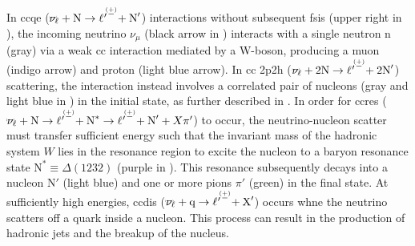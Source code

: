In \acrshort{cc}\acrshort{qe} ($\accentset{\brobor\vspace{-.5mm}}{\nu}_\ell + \text{N} \rightarrow \ell{\hspace{0.1ex}'}^{\hspace{0.1ex} \accentset{(+)\vspace{-.8mm}}{-}} + \text{N}'$) interactions without subsequent \acrshort{fsi}s (upper right in ), the incoming neutrino $\nu_\mu$ (black arrow in ) interacts with a single neutron n (gray) via a weak \acrshort{cc} interaction mediated by a W-boson, producing a muon (indigo arrow) and proton (light blue arrow).
In \acrshort{cc} \acrshort{2p2h} ($\accentset{\brobor\vspace{-.5mm}}{\nu}_\ell + 2\text{N} \rightarrow \ell{\hspace{0.1ex}'}^{\hspace{0.1ex} \accentset{(+)\vspace{-.8mm}}{-}} + 2\text{N}'$) scattering, the interaction instead involves a correlated pair of nucleons (gray and light blue in ) in the initial state, as further described in .
In order for \acrshort{cc}\acrshort{res} ($\accentset{\brobor\vspace{-.5mm}}{\nu}_\ell + \text{N} \rightarrow \ell{\hspace{0.1ex}'}^{\hspace{0.1ex} \accentset{(+)\vspace{-.8mm}}{-}} + \text{N}^* \rightarrow \ell{\hspace{0.1ex}'}^{\hspace{0.1ex} \accentset{(+)\vspace{-.8mm}}{-}} + \text{N}' + X\pi'$) to occur, the neutrino-nucleon scatter must transfer sufficient energy such that the invariant mass of the hadronic system $W$ lies in the resonance region to excite the nucleon to a baryon resonance state $\text{N}^* \equiv \Delta (1232)$ (purple in ). This resonance subsequently decays into a nucleon $\text{N}'$ (light blue) and one or more pions $\pi'$ (green) in the final state.
At sufficiently high energies, \acrshort{cc}\acrshort{dis} ($\accentset{\brobor\vspace{-.5mm}}{\nu}_\ell + \text{q} \rightarrow \ell{\hspace{0.1ex}'}^{\hspace{0.1ex} \accentset{(+)\vspace{-.8mm}}{-}} + \text{X}'$) occurs whne the neutrino scatters off a quark inside a nucleon. This process can result in the production of hadronic jets and the breakup of the nucleus.

